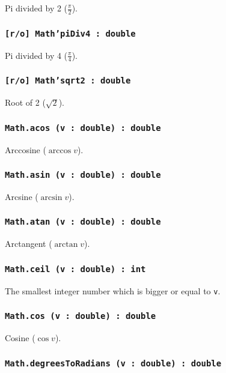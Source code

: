 Pi divided by 2 ($\frac{\pi}{2}$).

\subsubsection{\texttt{[r/o] Math'piDiv4 : double}}

Pi divided by 4 ($\frac{\pi}{4}$).

\subsubsection{\texttt{[r/o] Math'sqrt2 : double}}

Root of 2 ($\sqrt{2}$).

\subsubsection{\texttt{Math.acos (v : double) : double}}

Arccosine ($\arccos{v}$).

\subsubsection{\texttt{Math.asin (v : double) : double}}

Arcsine ($\arcsin{v}$).

\subsubsection{\texttt{Math.atan (v : double) : double}}

Arctangent ($\arctan{v}$).

\subsubsection{\texttt{Math.ceil (v : double) : int}}

The smallest integer number which is bigger or equal to \texttt{v}.

\subsubsection{\texttt{Math.cos (v : double) : double}}

Cosine ($\cos{v}$).

\subsubsection{\texttt{Math.degreesToRadians (v : double) : double}}

